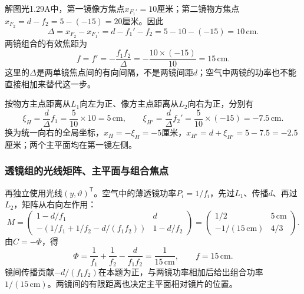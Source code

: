 \documentclass[UTF8,fontset=fandol,a4paper,11pt]{ctexart}
\newcommand{\figcaption}[1]{\par\vspace{2pt}{\small\color{muted}#1}\par}
\begin{document}
解图光1.29A中，第一镜像方焦点$x_{F_1'}=10$厘米；第二镜物方焦点$x_{F_2}=d-f_2=5-(-15)=20$厘米。因此
\[
\Delta=x_{F_2}-x_{F_1'}=d-f_1'-f_2
=5-10-(-15)=10\,\mathrm{cm}.
\]
两镜组合的有效焦距为
\[
f=f'=-\frac{f_1f_2}{\Delta}
=-\frac{10\times(-15)}{10}
=15\,\mathrm{cm}.
\]
这里的$\Delta$是两单镜焦点间的有向间隔，不是两镜间距$d$；空气中两镜的功率也不能直接相加来替代这一步。
\begin{center}\begin{minipage}{.97\linewidth}\centering
{}
\figcaption{解图光1.29A\quad 单镜焦点与有向光学间隔}
\end{minipage}\end{center}

按物方主点距离从$L_1$向左为正、像方主点距离从$L_2$向右为正，分别有
\[
\xi_H=\frac d\Delta f_1=\frac5{10}\times10=5\,\mathrm{cm},
\qquad
\xi_{H'}=\frac d\Delta f_2'=\frac5{10}\times(-15)=-7.5\,\mathrm{cm}.
\]
换为统一向右的全局坐标，$x_H=-\xi_H=-5$厘米，$x_{H'}=d+\xi_{H'}=5-7.5=-2.5$厘米；两个主平面均在第一镜左侧。

\subsubsection*{透镜组的光线矩阵、主平面与组合焦点}
再独立使用光线$(y,\vartheta)^{\mathsf T}$。空气中的薄透镜功率$P_i=1/f_i$，先过$L_1$、传播$d$、再过$L_2$，矩阵从右向左作用：
\[
M=\begin{pmatrix}1-d/f_1&d\\
-(1/f_1+1/f_2-d/(f_1f_2))&1-d/f_2
\end{pmatrix}
=\begin{pmatrix}1/2&5\,\mathrm{cm}\\
-1/(15\,\mathrm{cm})&4/3
\end{pmatrix}.
\]
由$C=-\Phi$，得
\[
\Phi=\frac1{f_1}+\frac1{f_2}-\frac d{f_1f_2}
=\frac1{15\,\mathrm{cm}},\qquad
\boxed{f=15\,\mathrm{cm}}.
\]
镜间传播贡献$-d/(f_1f_2)$在本题为正，与两镜功率相加后给出组合功率$1/(15\,\mathrm{cm})$。两镜间的有限距离也决定主平面相对镜片的位置。
\end{document}
